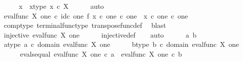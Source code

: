 \begin{isabellebody}
\ \ \isamarkupfalse%
\ \isamarkupfalse%
\ x\ \ x{\isacharunderscore}{\kern0pt}type{\isacharcolon}{\kern0pt}\ {\isachardoublequoteopen}x\ {\isasymin}\isactrlsub c\ X{\isachardoublequoteclose}\isanewline
\ \ \ \ \isamarkupfalse%
\ auto\isanewline
\ \ \isamarkupfalse%
\ \isamarkupfalse%
\ {\isachardoublequoteopen}eval{\isacharunderscore}{\kern0pt}func\ X\ one\ {\isasymcirc}\isactrlsub c\ id\isactrlsub c\ one\ {\isasymtimes}\isactrlsub f\ {\isacharparenleft}{\kern0pt}x\ {\isasymcirc}\isactrlsub c\ {\isasymbeta}\isactrlbsub one\ {\isasymtimes}\isactrlsub c\ one\isactrlesub {\isacharparenright}{\kern0pt}\isactrlsup {\isasymsharp}\ {\isacharequal}{\kern0pt}\ x\ {\isasymcirc}\isactrlsub c\ {\isasymbeta}\isactrlbsub one\ {\isasymtimes}\isactrlsub c\ one\isactrlesub {\isachardoublequoteclose}\isanewline
\ \ \ \ \isamarkupfalse%
\ comp{\isacharunderscore}{\kern0pt}type\ terminal{\isacharunderscore}{\kern0pt}func{\isacharunderscore}{\kern0pt}type\ transpose{\isacharunderscore}{\kern0pt}func{\isacharunderscore}{\kern0pt}def\ \isamarkupfalse%
\ blast\isanewline
\ \ \isanewline
\ \ \isamarkupfalse%
\ {\isachardoublequoteopen}injective\ {\isacharparenleft}{\kern0pt}eval{\isacharunderscore}{\kern0pt}func\ X\ one{\isacharparenright}{\kern0pt}{\isachardoublequoteclose}\isanewline
\ \ \ \ \isamarkupfalse%
\ injective{\isacharunderscore}{\kern0pt}def\isanewline
\ \ \isamarkupfalse%
\ auto\isanewline
\ \ \ \ \isamarkupfalse%
\ a\ b\isanewline
\ \ \ \ \isamarkupfalse%
\ a{\isacharunderscore}{\kern0pt}type{\isacharcolon}{\kern0pt}\ {\isachardoublequoteopen}a\ {\isasymin}\isactrlsub c\ domain\ {\isacharparenleft}{\kern0pt}eval{\isacharunderscore}{\kern0pt}func\ X\ one{\isacharparenright}{\kern0pt}{\isachardoublequoteclose}\isanewline
\ \ \ \ \isamarkupfalse%
\ b{\isacharunderscore}{\kern0pt}type{\isacharcolon}{\kern0pt}\ {\isachardoublequoteopen}b\ {\isasymin}\isactrlsub c\ domain\ {\isacharparenleft}{\kern0pt}eval{\isacharunderscore}{\kern0pt}func\ X\ one{\isacharparenright}{\kern0pt}{\isachardoublequoteclose}\isanewline
\ \ \ \ \isamarkupfalse%
\ evals{\isacharunderscore}{\kern0pt}equal{\isacharcolon}{\kern0pt}\ {\isachardoublequoteopen}eval{\isacharunderscore}{\kern0pt}func\ X\ one\ {\isasymcirc}\isactrlsub c\ a\ {\isacharequal}{\kern0pt}\ eval{\isacharunderscore}{\kern0pt}func\ X\ one\ {\isasymcirc}\isactrlsub c\ b{\isachardoublequoteclose}\isanewline

\end{isabellebody}
